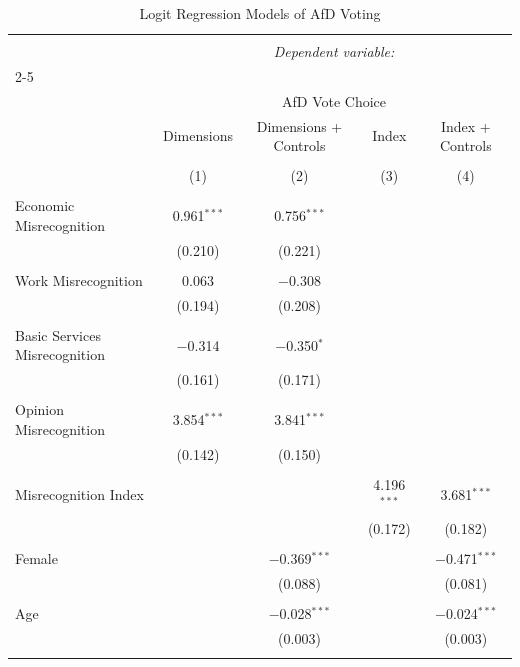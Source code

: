 
\begin{table}[!htbp] \centering 
  \caption{Logit Regression Models of AfD Voting} 
  \label{tab:afd_regression} 
\begin{tabular}{@{\extracolsep{5pt}}lcccc} 
\\[-1.8ex]\hline 
\hline \\[-1.8ex] 
 & \multicolumn{4}{c}{\textit{Dependent variable:}} \\ 
\cline{2-5} 
\\[-1.8ex] & \multicolumn{4}{c}{AfD Vote Choice} \\ 
 & Dimensions & Dimensions + Controls & Index & Index + Controls \\ 
\\[-1.8ex] & (1) & (2) & (3) & (4)\\ 
\hline \\[-1.8ex] 
 Economic Misrecognition & 0.961$^{***}$ & 0.756$^{***}$ &  &  \\ 
  & (0.210) & (0.221) &  &  \\ 
  & & & & \\ 
 Work Misrecognition & 0.063 & $-$0.308 &  &  \\ 
  & (0.194) & (0.208) &  &  \\ 
  & & & & \\ 
 Basic Services Misrecognition & $-$0.314 & $-$0.350$^{*}$ &  &  \\ 
  & (0.161) & (0.171) &  &  \\ 
  & & & & \\ 
 Opinion Misrecognition & 3.854$^{***}$ & 3.841$^{***}$ &  &  \\ 
  & (0.142) & (0.150) &  &  \\ 
  & & & & \\ 
 Misrecognition Index &  &  & 4.196$^{***}$ & 3.681$^{***}$ \\ 
  &  &  & (0.172) & (0.182) \\ 
  & & & & \\ 
 Female &  & $-$0.369$^{***}$ &  & $-$0.471$^{***}$ \\ 
  &  & (0.088) &  & (0.081) \\ 
  & & & & \\ 
 Age &  & $-$0.028$^{***}$ &  & $-$0.024$^{***}$ \\ 
  &  & (0.003) &  & (0.003) \\ 
  & & & & \\ 

\end{tabular}
\end{table}
